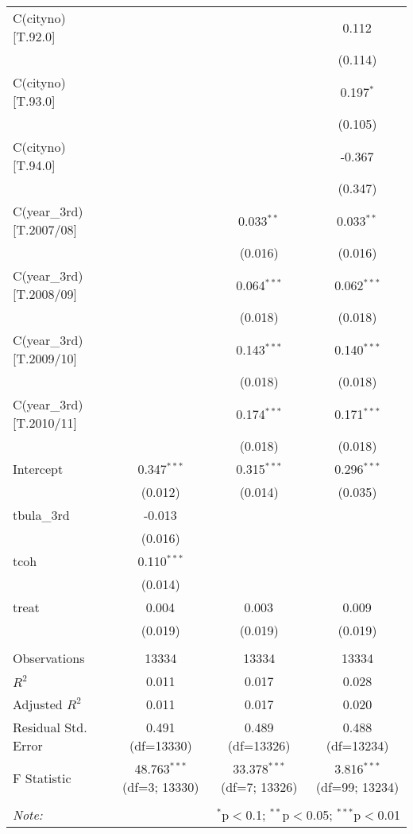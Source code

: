\begin{table}[!htbp]
\begin{tabular}{@{\extracolsep{5pt}}lccc}
 C(cityno)[T.92.0] & & & 0.112$^{}$ \\
& & & (0.114) \\
 C(cityno)[T.93.0] & & & 0.197$^{*}$ \\
& & & (0.105) \\
 C(cityno)[T.94.0] & & & -0.367$^{}$ \\
& & & (0.347) \\
 C(year_3rd)[T.2007/08] & & 0.033$^{**}$ & 0.033$^{**}$ \\
& & (0.016) & (0.016) \\
 C(year_3rd)[T.2008/09] & & 0.064$^{***}$ & 0.062$^{***}$ \\
& & (0.018) & (0.018) \\
 C(year_3rd)[T.2009/10] & & 0.143$^{***}$ & 0.140$^{***}$ \\
& & (0.018) & (0.018) \\
 C(year_3rd)[T.2010/11] & & 0.174$^{***}$ & 0.171$^{***}$ \\
& & (0.018) & (0.018) \\
 Intercept & 0.347$^{***}$ & 0.315$^{***}$ & 0.296$^{***}$ \\
& (0.012) & (0.014) & (0.035) \\
 tbula_3rd & -0.013$^{}$ & & \\
& (0.016) & & \\
 tcoh & 0.110$^{***}$ & & \\
& (0.014) & & \\
 treat & 0.004$^{}$ & 0.003$^{}$ & 0.009$^{}$ \\
& (0.019) & (0.019) & (0.019) \\
\hline \\[-1.8ex]
 Observations & 13334 & 13334 & 13334 \\
 $R^2$ & 0.011 & 0.017 & 0.028 \\
 Adjusted $R^2$ & 0.011 & 0.017 & 0.020 \\
 Residual Std. Error & 0.491 (df=13330) & 0.489 (df=13326) & 0.488 (df=13234) \\
 F Statistic & 48.763$^{***}$ (df=3; 13330) & 33.378$^{***}$ (df=7; 13326) & 3.816$^{***}$ (df=99; 13234) \\
\hline
\hline \\[-1.8ex]
\textit{Note:} & \multicolumn{3}{r}{$^{*}$p$<$0.1; $^{**}$p$<$0.05; $^{***}$p$<$0.01} \\
\end{tabular}
\end{table}

